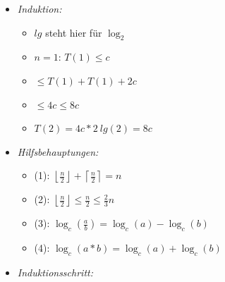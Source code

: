 \documentclass[
    ngerman,
    color=3b,
    load_common, %
    summary,
    boxarc,
]{tuda_summary}
\begin{document}
\begin{itemize}
\begin{itemize}
\begin{itemize}
                        \item \textit{Induktion:}
                              \begin{itemize}
                                  \item $lg$ steht hier für $\log_2$
                                  \item $n = 1$: $T(1) \leq c$
                                  \item {}  $\leq T(1) + T(1) +2c$
                                  \item[] {\makebox[2cm][l]{}} $\leq 4c \leq 8c$
                                  \item[] {\makebox[1cm][l]{}} $T(2) = 4c * 2~lg(2) = 8c$
                              \end{itemize}
                        \item \textit{Hilfsbehauptungen:}
                              \begin{itemize}
                                  \item (1): $\left \lfloor \frac{n}{2} \right \rfloor + \left \lceil \frac{n}{2} \right \rceil = n$
                                  \item (2): $\left \lfloor \frac{n}{2} \right \rfloor \leq \frac{n}{2} \leq \frac{2}{3}n$
                                  \item (3): $\log_c(\frac{a}{b}) = \log_c(a) - \log_c(b)$
                                  \item (4): $\log_c(a*b) = \log_c(a) + \log_c(b)$
                              \end{itemize}
                        \item \textit{Induktionsschritt:}
\end{itemize}
\end{itemize}
\end{itemize}
\end{document}
